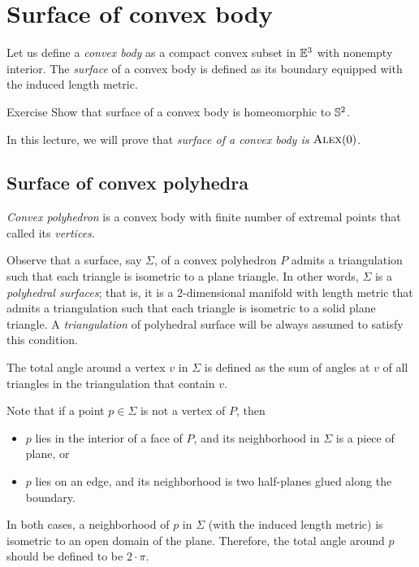 \chapter{Surface of convex body}\label{chap:convex-body}

Let us define a \emph{convex body} as a compact convex subset in $\mathbb{E}^3$ with nonempty interior.
The \emph{surface} of a convex body is defined as its boundary equipped with the induced length metric.

\begin{thm}{Exercise}\label{ex:surf-S2}
Show that surface of a convex body is homeomorphic to $\mathbb{S}^2$.
\end{thm}

In this lecture, we will prove that \textit{surface of a convex body is $\textsc{Alex}(0)$.}


\section{Surface of convex polyhedra}

\emph{Convex polyhedron} is a convex body with finite number of extremal points that called its \emph{vertices}.

Observe that a surface, say $\Sigma$, of a convex polyhedron $P$ admits a triangulation such that each triangle is isometric to a plane triangle.
In other words, $\Sigma$ is a \emph{polyhedral surfaces};
that is, it is a 2-dimensional manifold with length metric that admits a triangulation such that each triangle is isometric to a solid plane triangle.
A \emph{triangulation} of polyhedral surface will be always assumed to satisfy this condition.

The total angle around a vertex $v$ in $\Sigma$ is defined as the sum of angles at $v$ of all triangles in the triangulation that contain $v$.

Note that if a point $p\in \Sigma$ is not a vertex of $P$,
then
\begin{itemize}
\item $p$ lies in the interior of a face of $P$, and its neighborhood in $\Sigma$ is a piece of plane, or
\item $p$ lies on an edge, and its neighborhood is two half-planes glued along the boundary.
\end{itemize}
In both cases, a neighborhood of $p$ in $\Sigma$ (with the induced length metric) is isometric to an open domain of the plane.
Therefore, the total angle around $p$ should be defined to be $2\cdot\pi$.

